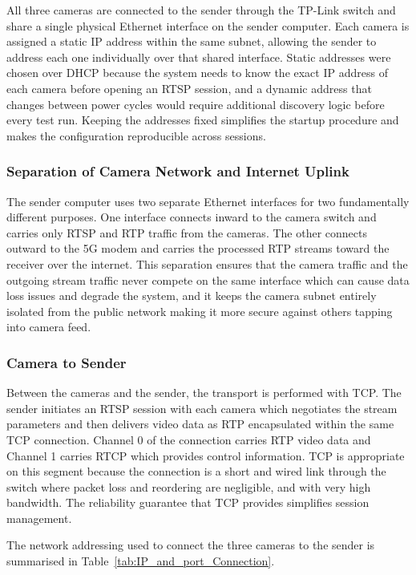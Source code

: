 All three cameras are connected to the sender through the TP-Link switch and share a single physical Ethernet interface on the sender computer. Each camera is assigned a static IP address within the same subnet, allowing the sender to address each one individually over that shared interface. Static addresses were chosen over DHCP because the system needs to know the exact IP address of each camera before opening an RTSP session, and a dynamic address that changes between power cycles would require additional discovery logic before every test run. Keeping the addresses fixed simplifies the startup procedure and makes the configuration reproducible across sessions.

\subsubsection{Separation of Camera Network and Internet Uplink}

The sender computer uses two separate Ethernet interfaces for two fundamentally different purposes. One interface connects inward to the camera switch and carries only RTSP and RTP traffic from the cameras. The other connects outward to the 5G modem and carries the processed RTP streams toward the receiver over the internet. This separation ensures that the camera traffic and the outgoing stream traffic never compete on the same interface which can cause data loss issues and degrade the system, and it keeps the camera subnet entirely isolated from the public network making it more secure against others tapping into camera feed.

\subsubsection{Camera to Sender}

Between the cameras and the sender, the transport is performed with TCP. The sender initiates an RTSP session with each camera which negotiates the stream parameters and then delivers video data as RTP encapsulated within the same TCP connection. Channel 0 of the connection carries RTP video data and Channel 1 carries RTCP which provides control information. TCP is appropriate on this segment because the connection is a short and wired link through the switch where packet loss and reordering are negligible, and with very high bandwidth. The reliability guarantee that TCP provides simplifies session management.

The network addressing used to connect the three cameras to the sender is summarised in Table~\ref{tab:IP_and_port_Connection}.

